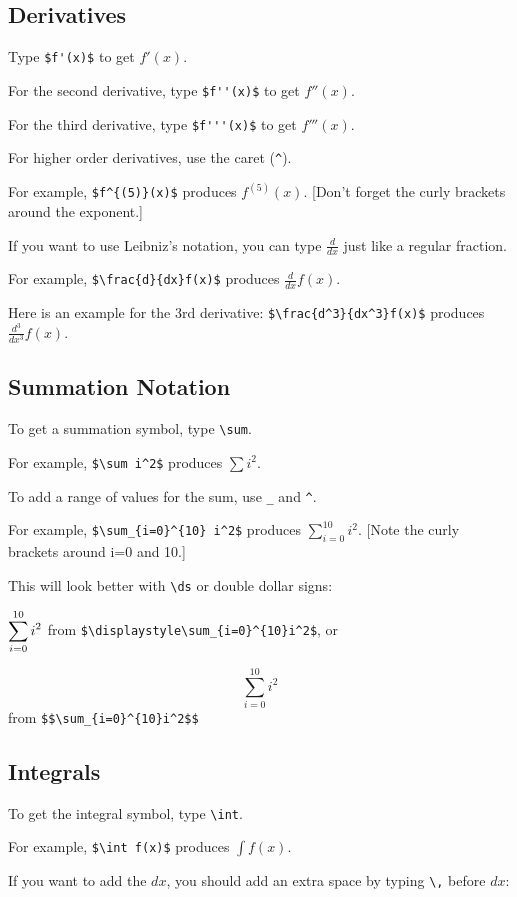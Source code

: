 \documentclass[12pt]{article}
\begin{document}
\subsection{Derivatives}

Type \verb|$f'(x)$| to get $f'(x)$.

For the second derivative, type \verb|$f''(x)$| to get $f''(x)$.

For the third derivative, type \verb|$f'''(x)$| to get $f'''(x)$.

For higher order derivatives, use the caret (\verb|^|).

For example, \verb|$f^{(5)}(x)$| produces $f^{(5)}(x)$. [Don't forget the curly brackets around the exponent.]

If you want to use Leibniz's notation, you can type $\frac{d}{dx}$ just like a regular fraction.

For example, \verb|$\frac{d}{dx}f(x)$| produces $\frac{d}{dx}f(x)$.

Here is an example for the 3rd derivative: \verb|$\frac{d^3}{dx^3}f(x)$| produces $\frac{d^3}{dx^3}f(x)$.

\subsection{Summation Notation}

To get a summation symbol, type \verb|\sum|.

For example, \verb|$\sum i^2$| produces $\sum i^2$.

To add a range of values for the sum, use \verb|_| and \verb|^|.

For example, \verb|$\sum_{i=0}^{10} i^2$| produces $\sum_{i=0}^{10} i^2$. [Note the curly brackets around i=0 and 10.]

This will look better with \verb|\ds| or double dollar signs:

$\displaystyle\sum_{i=0}^{10}i^2$ from \verb|$\displaystyle\sum_{i=0}^{10}i^2$|, or

$$\sum_{i=0}^{10}i^2$$ from \verb|$$\sum_{i=0}^{10}i^2$$|

\subsection{Integrals}

To get the integral symbol, type \verb|\int|.

For example, \verb|$\int f(x)$| produces $\int f(x)$.

If you want to add the $dx$, you should add an extra space by typing \verb|\,| before $dx$:
\end{document}
